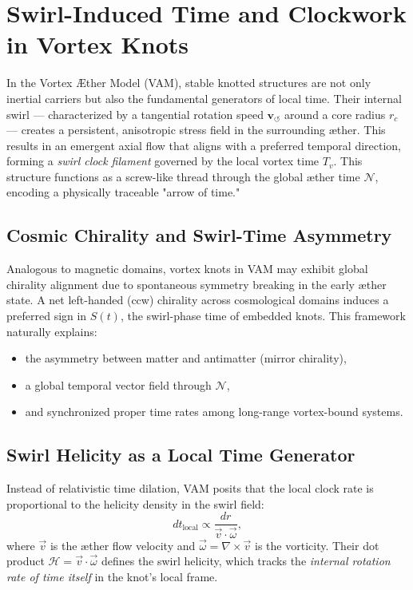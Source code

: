 \section{Swirl-Induced Time and Clockwork in Vortex Knots}

In the Vortex \AE{}ther Model (VAM), stable knotted structures are not only inertial carriers but also the fundamental generators of local time. Their internal swirl — characterized by a tangential rotation speed \( \mathbf{v}_{\scriptscriptstyle\boldsymbol{\circlearrowleft}} \) around a core radius \( r_c \) — creates a persistent, anisotropic stress field in the surrounding æther. This results in an emergent axial flow that aligns with a preferred temporal direction, forming a \emph{swirl clock filament} governed by the local vortex time \( T_v \). This structure functions as a screw-like thread through the global æther time \( \mathcal{N} \), encoding a physically traceable "arrow of time."

\subsection*{Cosmic Chirality and Swirl-Time Asymmetry}

Analogous to magnetic domains, vortex knots in VAM may exhibit global chirality alignment due to spontaneous symmetry breaking in the early æther state. A net left-handed (ccw) chirality across cosmological domains induces a preferred sign in \( S(t) \), the swirl-phase time of embedded knots. This framework naturally explains:
\begin{itemize}
  \item the asymmetry between matter and antimatter (mirror chirality),
  \item a global temporal vector field through \( \mathcal{N} \),
  \item and synchronized proper time rates among long-range vortex-bound systems.
\end{itemize}

\subsection*{Swirl Helicity as a Local Time Generator}

Instead of relativistic time dilation, VAM posits that the local clock rate is proportional to the helicity density in the swirl field:
\[
    dt_{\text{local}} \propto \frac{dr}{\vec{v} \cdot \vec{\omega}},
\]
where \( \vec{v} \) is the æther flow velocity and \( \vec{\omega} = \nabla \times \vec{v} \) is the vorticity. Their dot product \( \mathcal{H} = \vec{v} \cdot \vec{\omega} \) defines the swirl helicity, which tracks the \emph{internal rotation rate of time itself} in the knot’s local frame.

